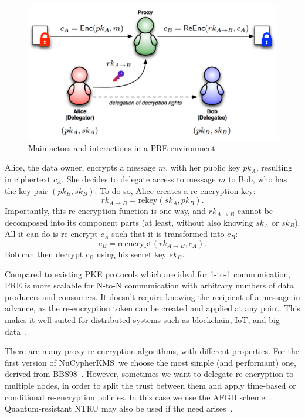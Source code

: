 \documentclass[notitlepage,longbibliography]{revtex4-1}
\newcommand{\kms}{NuCypherKMS}
\begin{document}
\begin{figure}
\centering
    \includegraphics[width=0.6\columnwidth]{pdf/pre.png}  %
    \caption{Main actors and interactions in a PRE environment}
    \label{fig:pre}
\end{figure}

Alice, the data owner, encrypts a message $m$, with her public key $pk_A$, resulting in ciphertext $c_A$.
She decides to delegate access to message $m$ to Bob, who has the key pair $(pk_B, sk_B)$.
To do so, Alice creates a re-encryption key:
\begin{equation}
    rk_{A\rightarrow B} = \text{rekey}(sk_A, pk_B).
\end{equation}
Importantly, this re-encryption function is one way, and $rk_{A\rightarrow B}$ cannot be decomposed into its component parts
(at least, without also knowing $sk_A$ or $sk_B$).
All it can do is re-encrypt $c_A$ such that it is transformed into $c_B$:
\begin{equation}
    c_B = \text{reencrypt}(rk_{A\rightarrow B}, c_{A}).
\end{equation}
Bob can then decrypt $c_{B}$ using his secret key $sk_{B}$.

Compared to existing PKE protocols which are ideal for 1-to-1 communication, PRE is more scalable for N-to-N communication
with arbitrary numbers of data producers and consumers.
It doesn't require knowing the recipient of a message in advance, as the re-encryption token can be created and applied at any point.
This makes it well-suited for distributed systems such as blockchain, IoT, and big data~\cite{web:nucypher-hadoop}.

There are many proxy re-encryption algorithms, with different properties.
For the first version of \kms~we choose the most simple (and performant) one, derived from BBS98~\cite{BBS98}.
However, sometimes we want to delegate re-encryption to multiple nodes, in order to split the trust between them and apply time-based or conditional
re-encryption policies.
In this case we use the AFGH scheme~\cite{AFGH}.
Quantum-resistant NTRU may also be used if the need arises~\cite{wiki:ntru,ntrureencrypt}.
\end{document}
